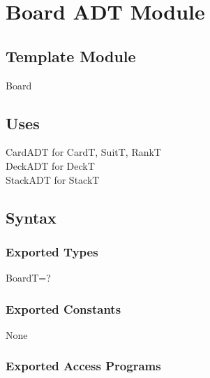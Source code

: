 \documentclass[12pt]{article}
\begin{document}
\section*{Board ADT Module}

\subsection*{Template Module}

Board

\subsection*{Uses}

CardADT for CardT, SuitT, RankT\\
DeckADT for DeckT\\
StackADT for StackT\\

\subsection*{Syntax}

\subsubsection*{Exported Types}

BoardT=?

\subsubsection*{Exported Constants}

None

\subsubsection*{Exported Access Programs}
\end{document}
